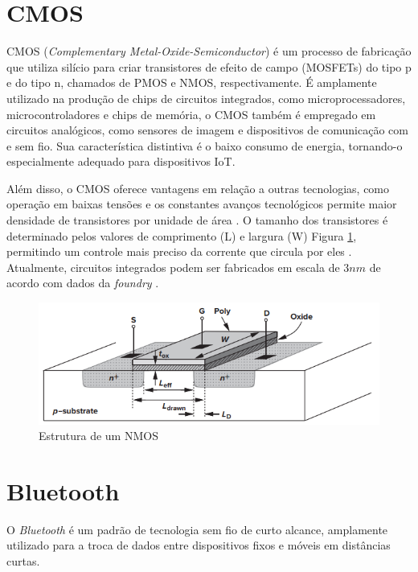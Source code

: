 \section{CMOS}
CMOS (\textit{Complementary Metal-Oxide-Semiconductor}) é um processo de fabricação que utiliza silício para criar transistores de efeito de campo (MOSFETs) do tipo p e do tipo n, chamados de PMOS e NMOS, respectivamente. É amplamente utilizado na produção de chips de circuitos integrados, como microprocessadores, microcontroladores e chips de memória, o CMOS também é empregado em circuitos analógicos, como sensores de imagem e dispositivos de comunicação com e sem fio. Sua característica distintiva é o baixo consumo de energia, tornando-o especialmente adequado para dispositivos IoT.

Além disso, o CMOS oferece vantagens em relação a outras tecnologias, como operação em baixas tensões e os constantes avanços tecnológicos permite maior densidade de transistores por unidade de área . O tamanho dos transistores é determinado pelos valores de comprimento (L) e largura (W) Figura \ref{fig:nmos_structure}, permitindo um controle mais preciso da corrente que circula por eles \cite{designcmosrazavi2016}. Atualmente, circuitos integrados podem ser fabricados em escala de $3nm$ de acordo com dados da \textit{foundry} \cite{tsmc}.

\begin{figure}[htb]
	\caption{Estrutura de um NMOS}
	\begin{center}
		\includegraphics[scale=0.6]{img/nmos_structure.png}
	\end{center}
	\label{fig:nmos_structure}
\end{figure}

\section{Bluetooth}
O \textit{Bluetooth} é um padrão de tecnologia sem fio de curto alcance, amplamente utilizado para a troca de dados entre dispositivos fixos e móveis em distâncias curtas. 

